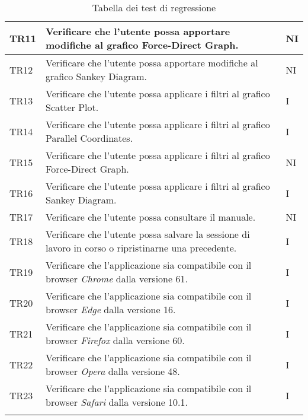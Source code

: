 \begin{center}
\begin{longtable}{|p{1.5cm}|p{11cm}|p{1cm}|}
            \rowcolor[HTML]{C0C0C0}
            TR11 & Verificare che l’utente possa apportare modifiche al grafico Force-Direct Graph. & NI\\ \hline
            \rowcolor[HTML]{EFEFEF}
            TR12 & Verificare che l’utente possa apportare modifiche al grafico Sankey Diagram. & NI\\ \hline
            \rowcolor[HTML]{C0C0C0}
            TR13 & Verificare che l’utente possa applicare i filtri al grafico Scatter Plot. & I\\ \hline
            \rowcolor[HTML]{EFEFEF}
            TR14 & Verificare che l’utente possa applicare i filtri al grafico Parallel Coordinates. & I\\ \hline
            \rowcolor[HTML]{C0C0C0}
            TR15 & Verificare che l’utente possa applicare i filtri al grafico Force-Direct Graph. & NI\\ \hline
            \rowcolor[HTML]{EFEFEF}
            TR16 & Verificare che l’utente possa applicare i filtri al grafico Sankey Diagram. & I\\ \hline
            \rowcolor[HTML]{C0C0C0}
            TR17 & Verificare che l’utente possa consultare il manuale. & NI\\ \hline
            \rowcolor[HTML]{EFEFEF}
            TR18 & Verificare che l’utente possa salvare la sessione di lavoro in corso o ripristinarne una precedente. & I\\ \hline
            \rowcolor[HTML]{C0C0C0}
            TR19 & Verificare che l'applicazione sia compatibile con il browser \textit{Chrome} dalla versione 61. & I\\ \hline
            \rowcolor[HTML]{EFEFEF}
            TR20 & Verificare che l'applicazione sia compatibile con il browser \textit{Edge} dalla versione 16. & I\\ \hline
            \rowcolor[HTML]{C0C0C0}
            TR21 & Verificare che l'applicazione sia compatibile con il browser \textit{Firefox} dalla versione 60. & I\\ \hline
            \rowcolor[HTML]{EFEFEF}
            TR22 & Verificare che l'applicazione sia compatibile con il browser \textit{Opera} dalla versione 48. & I\\ \hline
            \rowcolor[HTML]{C0C0C0}
            TR23 & Verificare che l'applicazione sia compatibile con il browser \textit{Safari} dalla versione 10.1. & I\\ \hline
            \caption{Tabella dei test di regressione}
        \end{longtable}
    \end{center}


